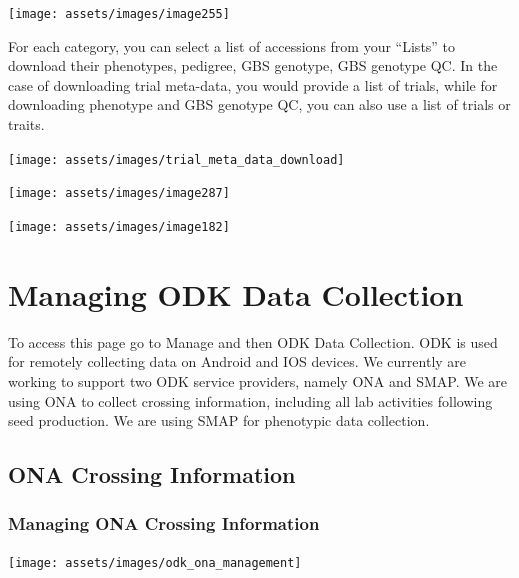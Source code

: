 \documentclass[
  12pt,
]{book}
\begin{document}
\begin{center}\texttt{[image: assets/images/image255]} \end{center}

For each category, you can select a list of accessions from your ``Lists'' to download their phenotypes, pedigree, GBS genotype, GBS genotype QC. In the case of downloading trial meta-data, you would provide a list of trials, while for downloading phenotype and GBS genotype QC, you can also use a list of trials or traits.

\begin{center}\texttt{[image: assets/images/trial\_meta\_data\_download]} \end{center}

\begin{center}\texttt{[image: assets/images/image287]} \end{center}

\begin{center}\texttt{[image: assets/images/image182]} \end{center}

\hypertarget{managing-odk-data-collection}{%
\chapter{Managing ODK Data Collection}\label{managing-odk-data-collection}}

To access this page go to Manage and then ODK Data Collection. ODK is used for remotely collecting data on Android and IOS devices. We currently are working to support two ODK service providers, namely ONA and SMAP. We are using ONA to collect crossing information, including all lab activities following seed production. We are using SMAP for phenotypic data collection.

\hypertarget{ona-crossing-information}{%
\section{ONA Crossing Information}\label{ona-crossing-information}}

\hypertarget{managing-ona-crossing-information}{%
\subsection{Managing ONA Crossing Information}\label{managing-ona-crossing-information}}

\begin{center}\texttt{[image: assets/images/odk\_ona\_management]} \end{center}
\end{document}
